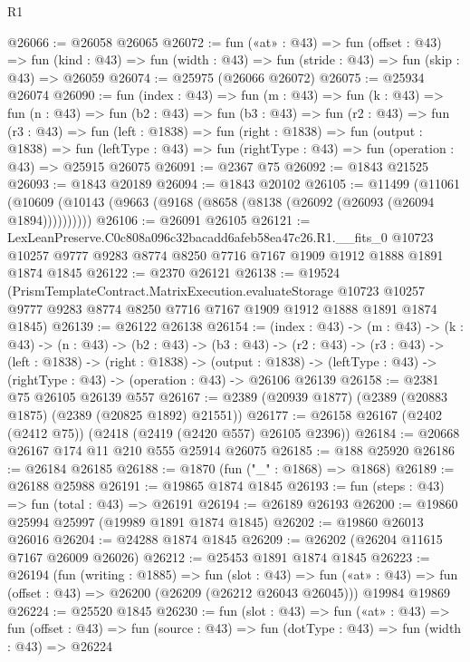 \begin{lexlean}{R1}
\begin{coremodule}
@26066 := @26058 @26065
@26072 := fun («at» : @43) =>
  fun (offset : @43) =>
  fun (kind : @43) => fun (width : @43) => fun (stride : @43) => fun (skip : @43) => @26059
@26074 := @25975 (@26066 @26072)
@26075 := @25934 @26074
@26090 := fun (index : @43) =>
  fun (m : @43) =>
  fun (k : @43) =>
  fun (n : @43) =>
  fun (b2 : @43) =>
  fun (b3 : @43) =>
  fun (r2 : @43) =>
  fun (r3 : @43) =>
  fun (left : @1838) =>
  fun (right : @1838) =>
  fun (output : @1838) =>
  fun (leftType : @43) => fun (rightType : @43) => fun (operation : @43) => @25915 @26075
@26091 := @2367 @75
@26092 := @1843 @21525
@26093 := @1843 @20189
@26094 := @1843 @20102
@26105 := @11499
    (@11061 (@10609 (@10143 (@9663 (@9168 (@8658 (@8138 (@26092 (@26093 (@26094 @1894))))))))))
@26106 := @26091 @26105
@26121 := LexLeanPreserve.C0c808a096c32bacadd6afeb58ea47c26.R1.__fits_0
    @10723
    @10257
    @9777
    @9283
    @8774
    @8250
    @7716
    @7167
    @1909
    @1912
    @1888
    @1891
    @1874
    @1845
@26122 := @2370 @26121
@26138 := @19524
    (PrismTemplateContract.MatrixExecution.evaluateStorage
      @10723
      @10257
      @9777
      @9283
      @8774
      @8250
      @7716
      @7167
      @1909
      @1912
      @1888
      @1891
      @1874
      @1845)
@26139 := @26122 @26138
@26154 := (index : @43) ->
  (m : @43) ->
  (k : @43) ->
  (n : @43) ->
  (b2 : @43) ->
  (b3 : @43) ->
  (r2 : @43) ->
  (r3 : @43) ->
  (left : @1838) ->
  (right : @1838) ->
  (output : @1838) -> (leftType : @43) -> (rightType : @43) -> (operation : @43) -> @26106 @26139
@26158 := @2381 @75 @26105 @26139 @557
@26167 := @2389 (@20939 @1877) (@2389 (@20883 @1875) (@2389 (@20825 @1892) @21551))
@26177 := @26158 @26167 (@2402 (@2412 @75)) (@2418 (@2419 (@2420 @557) @26105 @2396))
@26184 := @20668 @26167 @174 @11 @210 @555 @25914 @26075
@26185 := @188 @25920
@26186 := @26184 @26185
@26188 := @1870 (fun ("_" : @1868) => @1868)
@26189 := @26188 @25988
@26191 := @19865 @1874 @1845
@26193 := fun (steps : @43) => fun (total : @43) => @26191
@26194 := @26189 @26193
@26200 := @19860 @25994 @25997 (@19989 @1891 @1874 @1845)
@26202 := @19860 @26013 @26016
@26204 := @24288 @1874 @1845
@26209 := @26202 (@26204 @11615 @7167 @26009 @26026)
@26212 := @25453 @1891 @1874 @1845
@26223 := @26194
    (fun (writing : @1885) =>
    fun (slot : @43) =>
    fun («at» : @43) => fun (offset : @43) => @26200 (@26209 (@26212 @26043 @26045)))
    @19984
    @19869
@26224 := @25520 @1845
@26230 := fun (slot : @43) =>
  fun («at» : @43) =>
  fun (offset : @43) => fun (source : @43) => fun (dotType : @43) => fun (width : @43) => @26224

\end{coremodule}
\end{lexlean}
